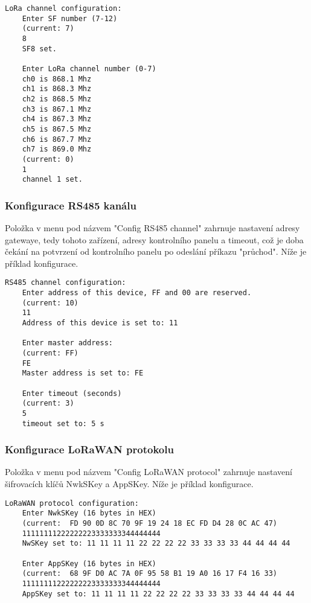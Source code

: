 \begin{lstlisting}[style=log]
    LoRa channel configuration:
    Enter SF number (7-12)
    (current: 7)
    8
    SF8 set.

    Enter LoRa channel number (0-7)
    ch0 is 868.1 Mhz
    ch1 is 868.3 Mhz
    ch2 is 868.5 Mhz
    ch3 is 867.1 Mhz
    ch4 is 867.3 Mhz
    ch5 is 867.5 Mhz
    ch6 is 867.7 Mhz
    ch7 is 869.0 Mhz
    (current: 0)
    1
    channel 1 set.
\end{lstlisting}

\subsubsection{Konfigurace RS485 kanálu}
Položka v menu pod názvem "Config RS485 channel" zahrnuje nastavení adresy gatewaye, tedy tohoto zařízení, adresy kontrolního panelu a timeout, což je doba čekání na potvrzení od kontrolního panelu po odeslání příkazu "průchod". Níže je příklad konfigurace.

\begin{lstlisting}[style=log]
    RS485 channel configuration:
    Enter address of this device, FF and 00 are reserved.
    (current: 10)
    11
    Address of this device is set to: 11

    Enter master address: 
    (current: FF)
    FE
    Master address is set to: FE

    Enter timeout (seconds)
    (current: 3)
    5
    timeout set to: 5 s
\end{lstlisting}


\subsubsection{Konfigurace LoRaWAN protokolu}
Položka v menu pod názvem "Config LoRaWAN protocol" zahrnuje nastavení šifrovacích klíčů NwkSKey a AppSKey. Níže je příklad konfigurace.

\begin{lstlisting}[style=log]    
    LoRaWAN protocol configuration:
    Enter NwkSKey (16 bytes in HEX)
    (current:  FD 90 0D 8C 70 9F 19 24 18 EC FD D4 28 0C AC 47)
    11111111222222223333333344444444
    NwSKey set to: 11 11 11 11 22 22 22 22 33 33 33 33 44 44 44 44

    Enter AppSKey (16 bytes in HEX)
    (current:  68 9F D0 AC 7A 0F 95 58 B1 19 A0 16 17 F4 16 33)
    11111111222222223333333344444444
    AppSKey set to: 11 11 11 11 22 22 22 22 33 33 33 33 44 44 44 44
\end{lstlisting}


